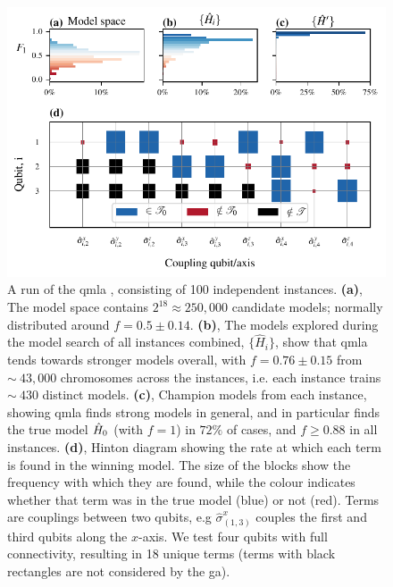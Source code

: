 \par 
\begin{figure}
    \begin{center}
        \includegraphics{theoretical_study/figures/gen_alg_run.pdf}
    \end{center}
    \caption[\Gls{run} of \gls{qmla} ]{
        A \gls{run} of the \gls{qmla} , consisting of 100 independent \glspl{instance}.
        \textbf{(a)}, The model space contains $2^{18}\approx250,000$ candidate models; 
            normally distributed around $f=0.5 \pm 0.14$. 
        \textbf{(b)}, The models explored during the model search of all \glspl{instance} combined, 
            $\{\hat{H}_i\}$, show that \gls{qmla} tends towards stronger models overall, 
            with $f = 0.76 \pm 0.15$ from $\sim~43,000$ chromosomes across the instances, 
            i.e. each \gls{instance} trains $\sim~430$ distinct models. 
        \textbf{(c)}, Champion models from each instance, showing \gls{qmla} finds strong models 
            in general, and in particular finds the true model $\hat{H}_0$ (with $f=1$) in $72\%$ of cases, 
            and $f \geq 0.88$ in all instances. 
        \textbf{(d)}, Hinton diagram showing the rate at which each term is found in the winning model. 
            The size of the blocks show the frequency with which they are found, while the colour indicates 
            whether that term was in the true model (blue) or not (red).
            Terms are couplings between two qubits, e.g $\hat{\sigma}_{(1, 3)}^{x}$ 
                couples the first and third qubits along the $x$-axis. 
            We test four qubits with full connectivity, resulting in 18 unique terms 
            (terms with black rectangles are not considered by the \gls{ga}).
}
    \label{fig:ga_run}
\end{figure}

